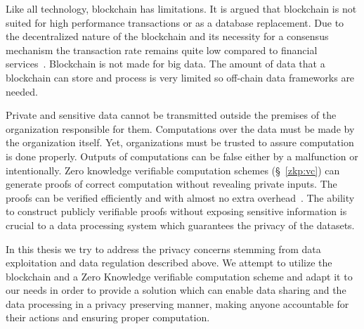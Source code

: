 Like all technology, blockchain has limitations. It is argued that blockchain is not suited for high performance transactions or as a database replacement. Due to the decentralized nature of the blockchain and its necessity for a consensus mechanism the transaction rate remains quite low compared to financial services~\cite{Sompolinsky2015, Zohar:2015:BUH:2817191.2701411}. Blockchain is not made for big data. The amount of data that a blockchain can store and process is very limited so off-chain data frameworks are needed.

Private and sensitive data cannot be transmitted outside the premises of the organization responsible for them. Computations over the data must be made by the organization itself. Yet, organizations must be trusted to assure computation is done properly. Outputs of computations can be false either by a malfunction or intentionally. Zero knowledge verifiable computation schemes (§~\ref{zkp:vc}) can generate proofs of correct computation without revealing private inputs. The proofs can be verified efficiently and with almost no extra overhead~\cite{pinocchio-nearly-practical-verifiable-computation}. The ability to construct publicly verifiable proofs without exposing sensitive information is crucial to a data processing system which guarantees the privacy of the datasets.

In this thesis we try to address the privacy concerns stemming from data exploitation and data regulation described above. We attempt to utilize the blockchain and a Zero Knowledge verifiable computation scheme and adapt it to our needs in order to provide a solution which can enable data sharing and the data processing in a privacy preserving manner, making anyone accountable for their actions and ensuring proper computation.
